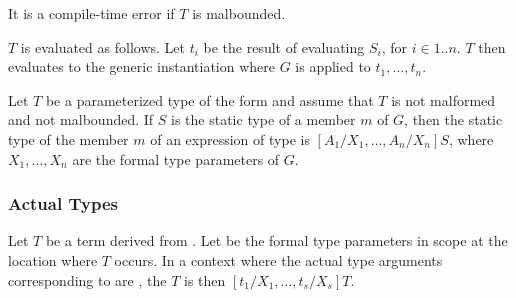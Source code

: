 \documentclass[makeidx]{article}
\begin{document}
{\LMHash{}%
It is a compile-time error if $T$ is malbounded.

\LMHash{}%
$T$ is evaluated as follows.
Let $t_i$ be the result of evaluating $S_i$, for $i \in 1 .. n$.
$T$ then evaluates to the generic instantiation where $G$ is applied to $t_1, \ldots, t_n$.

\LMHash{}%
Let $T$ be a parameterized type of the form
and assume that $T$ is not malformed and not malbounded.
If $S$ is the static type of a member $m$ of $G$,
then the static type of the member $m$ of an expression of type
is
$[A_1/X_1, \ldots, A_n/X_n]S$,
where $X_1, \ldots, X_n$ are the formal type parameters of $G$.



\subsubsection{Actual Types}

%

\LMHash{}%
Let $T$ be a term derived from .
Let  be the formal type parameters in scope
at the location where $T$ occurs.
In a context where the actual type arguments corresponding to
 are ,
the  $T$ is then
$[t_1/X_1, \ldots, t_s/X_s]T$.

}
\end{document}
